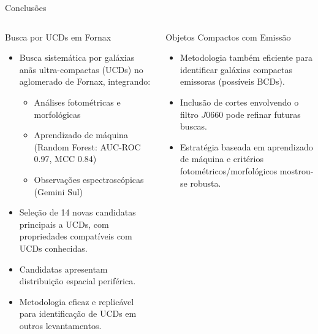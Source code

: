 \begin{frame}[c]{Conclusões}
    \scriptsize
    \begin{columns}[t]
        \begin{column}{0.48\textwidth}
            \begin{splusbox}{Busca por UCDs em Fornax}
                \begin{itemize}
                    \item Busca sistemática por galáxias anãs ultra-compactas (UCDs) no aglomerado de Fornax, integrando:
                    \begin{itemize}
                        \scriptsize
                        \item Análises fotométricas e morfológicas
                        \item Aprendizado de máquina (Random Forest: AUC-ROC 0.97, MCC 0.84)
                        \item Observações espectroscópicas (Gemini Sul)
                    \end{itemize}
                    \item Seleção de 14 novas candidatas principais a UCDs, com propriedades compatíveis com UCDs conhecidas.
                    \item Candidatas apresentam distribuição espacial periférica.
                    \item Metodologia eficaz e replicável para identificação de UCDs em outros levantamentos.
                \end{itemize}
            \end{splusbox}
        \end{column}
        \begin{column}{0.48\textwidth}
            \begin{splusbox}{Objetos Compactos com Emissão}
                \begin{itemize}
                    \item Metodologia também eficiente para identificar galáxias compactas emissoras (possíveis BCDs).
                    \item Inclusão de cortes envolvendo o filtro $J0660$ pode refinar futuras buscas.
                    \item Estratégia baseada em aprendizado de máquina e critérios fotométricos/morfológicos mostrou-se robusta.
                \end{itemize}
            \end{splusbox}
        \end{column}
    \end{columns}
\end{frame}

